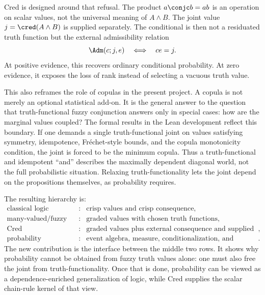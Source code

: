 Cred is designed around that refusal.  The product $a\conjc b=ab$ is an
operation on scalar values, not the universal meaning of $A\land B$.
The joint value $j=\cred(A\land B)$ is supplied separately.  The
conditional is then not a residuated truth function but the external
admissibility relation
\[
  \Adm(c;j,e)\quad\Longleftrightarrow\quad ce=j.
\]
At positive evidence, this recovers ordinary conditional probability.
At zero evidence, it exposes the loss of rank instead of selecting a
vacuous truth value.

This also reframes the role of copulas in the present project.  A copula
is not merely an optional statistical add-on.  It is the general answer
to the question that truth-functional fuzzy conjunction answers only in
special cases: how are the marginal values coupled?  The formal results
in the Lean development reflect this boundary.  If one demands a single
truth-functional joint on values satisfying symmetry, idempotence,
Fr\'echet-style bounds, and the copula monotonicity condition, the joint
is forced to be the minimum copula.  Thus a truth-functional and
idempotent ``and'' describes the maximally dependent diagonal world, not
the full probabilistic situation.  Relaxing truth-functionality lets the
joint depend on the propositions themselves, as probability requires.

The resulting hierarchy is:
\[
\begin{array}{rcl}
\text{classical logic} &:& \text{crisp values and crisp consequence},\\[1mm]
\text{many-valued/fuzzy logic} &:& \text{graded values with chosen truth functions},\\[1mm]
\text{Cred} &:& \text{graded values plus external consequence and supplied joints},\\[1mm]
\text{probability} &:& \text{event algebra, measure, conditionalization, and dependence structure}.
\end{array}
\]
The new contribution is the interface between the middle two rows.  It
shows why probability cannot be obtained from fuzzy truth values alone:
one must also free the joint from truth-functionality.  Once that is
done, probability can be viewed as a dependence-enriched generalization
of logic, while Cred supplies the scalar chain-rule kernel of that view.
